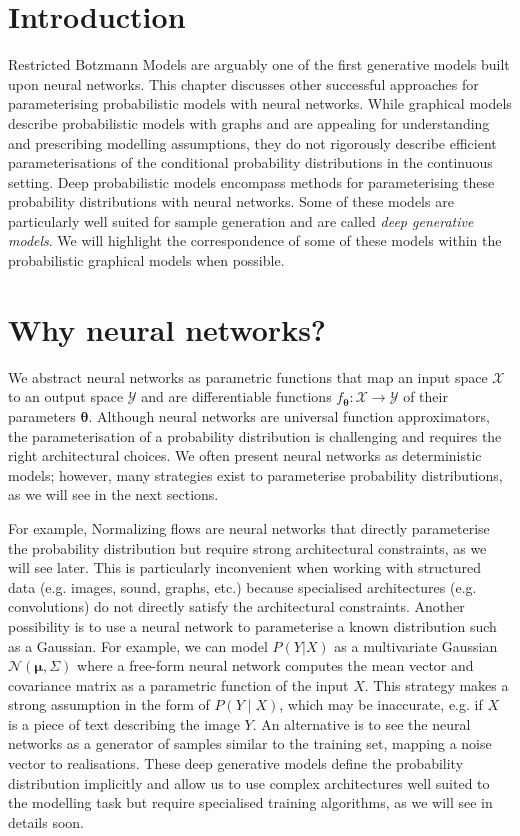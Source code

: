 \section{Introduction}
Restricted Botzmann Models are arguably one of the first generative models built upon neural networks. This chapter discusses other successful approaches for parameterising probabilistic models with neural networks. While graphical models describe probabilistic models with graphs and are appealing for understanding and prescribing modelling assumptions, they do not rigorously describe efficient parameterisations of the conditional probability distributions in the continuous setting. Deep probabilistic models encompass methods for parameterising these probability distributions with neural networks. Some of these models are particularly well suited for sample generation and are called \textit{deep generative models}. We will highlight the correspondence of some of these models within the probabilistic graphical models when possible.

\section{Why neural networks?}
We abstract neural networks as parametric functions that map an input space $\mathcal{X}$ to an output space $\mathcal{Y}$ and are differentiable functions $f_{\bm{\theta}}: \mathcal{X} \rightarrow \mathcal{Y}$ of their parameters $\bm{\theta}$. Although neural networks are universal function approximators, the parameterisation of a probability distribution is challenging and requires the right architectural choices. We often present neural networks as deterministic models; however, many strategies exist to parameterise probability distributions, as we will see in the next sections.

For example, Normalizing flows are neural networks that directly parameterise the probability distribution but require strong architectural constraints, as we will see later. This is particularly inconvenient when working with structured data (e.g. images, sound, graphs, etc.) because specialised architectures (e.g. convolutions) do not directly satisfy the architectural constraints. Another possibility is to use a neural network to parameterise a known distribution such as a Gaussian. For example, we can model $P(Y|X)$ as a multivariate Gaussian $\mathcal{N}(\bm{\mu}, \Sigma)$ where a free-form neural network computes the mean vector and covariance matrix as a parametric function of the input $X$. This strategy makes a strong assumption in the form of $P(Y\mid X)$, which may be inaccurate, e.g. if $X$ is a piece of text describing the image $Y$. An alternative is to see the neural networks as a generator of samples similar to the training set, mapping a noise vector to realisations. These deep generative models define the probability distribution implicitly and allow us to use complex architectures well suited to the modelling task but require specialised training algorithms, as we will see in details soon.

